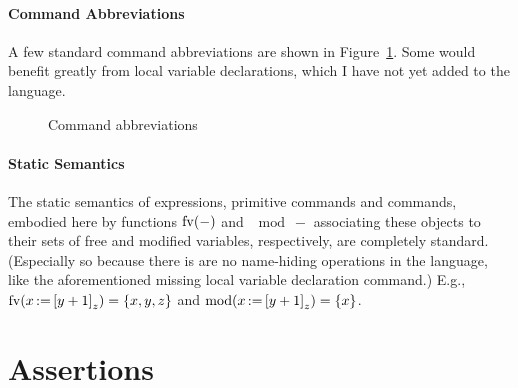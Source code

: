 \documentclass[11pt]{report}
\begin{document}
\paragraph{Command Abbreviations} A few standard command abbreviations are shown in Figure~\ref{fig:command-abbreviations}. Some would benefit greatly from local variable declarations, which I have not yet added to the language. 

\begin{figure}[ht]
	\centering
	\caption{\label{fig:command-abbreviations} Command abbreviations}
\end{figure}

\paragraph{Static Semantics} The static semantics of expressions, primitive commands and commands, embodied here by functions $\mathrm{fv}(-)$ and $\mod{-}$ associating these objects to their sets of free and modified variables, respectively, are completely standard. (Especially so because there is are no name-hiding operations in the language, like the aforementioned missing local variable declaration command.) E.g., $\mathrm{fv}(x \operatorname{:\!=} \left[ y+1 \right]_z) = \left\lbrace x,y,z \right\rbrace$ and $\mathrm{mod}(x \operatorname{:\!=} \left[ y+1 \right]_z) = \left\lbrace x \right\rbrace$.  

\section{Assertions}
\label{sec:assertions}
\end{document}
